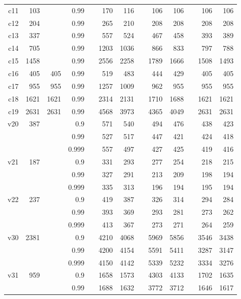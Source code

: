 \documentclass[a4paper,11pt]{article}
\begin{document}
\begin{table}
\begin{tabular}{@{\bfseries}rrrrrrrrrrrrr}
	c11  &  103 &      &  0.99 &&  170 &  116 &&  106 &  106 &&  106 &  106 \\
	c12  &  204 &      &  0.99 &&  265 &  210 &&  208 &  208 &&  208 &  208 \\
	c13  &  337 &      &  0.99 &&  557 &  524 &&  467 &  458 &&  393 &  389 \\
	c14  &  705 &      &  0.99 && 1203 & 1036 &&  866 &  833 &&  797 &  788 \\
	c15  & 1458 &      &  0.99 && 2556 & 2258 && 1789 & 1666 && 1508 & 1493 \\
	c16  &  405 &  405 &  0.99 &&  519 &  483 &&  444 &  429 &&  405 &  405 \\
	c17  &  955 &  955 &  0.99 && 1257 & 1009 &&  962 &  955 &&  955 &  955 \\
	c18  & 1621 & 1621 &  0.99 && 2314 & 2131 && 1710 & 1688 && 1621 & 1621 \\
	c19  & 2631 & 2631 &  0.99 && 4568 & 3973 && 4365 & 4049 && 2631 & 2631 \\[1ex]
	v20  &  387 &      &   0.9 &&  571 &  540 &&  494 &  476 &&  438 &  423 \\
	     &      &      &  0.99 &&  527 &  517 &&  447 &  421 &&  424 &  418 \\
	     &      &      & 0.999 &&  557 &  497 &&  427 &  425 &&  419 &  416 \\[1ex]
	v21  &  187 &      &   0.9 &&  331 &  293 &&  277 &  254 &&  218 &  215 \\
	     &      &      &  0.99 &&  327 &  291 &&  213 &  209 &&  198 &  194 \\
	     &      &      & 0.999 &&  335 &  313 &&  196 &  194 &&  195 &  194 \\[1ex]
	v22  &  237 &      &   0.9 &&  419 &  387 &&  326 &  314 &&  294 &  284 \\
	     &      &      &  0.99 &&  393 &  369 &&  293 &  281 &&  273 &  262 \\
	     &      &      & 0.999 &&  413 &  367 &&  273 &  271 &&  264 &  259 \\[1ex]
	v30  & 2381 &      &   0.9 && 4210 & 4068 && 5969 & 5856 && 3546 & 3438 \\
	     &      &      &  0.99 && 4200 & 4154 && 5591 & 5411 && 3287 & 3147 \\
	     &      &      & 0.999 && 4150 & 4142 && 5339 & 5232 && 3334 & 3276 \\[1ex]
	v31  &  959 &      &   0.9 && 1658 & 1573 && 4303 & 4133 && 1702 & 1635 \\
	     &      &      &  0.99 && 1688 & 1632 && 3772 & 3712 && 1646 & 1617 \\

\end{tabular}
\end{table}
\end{document}
